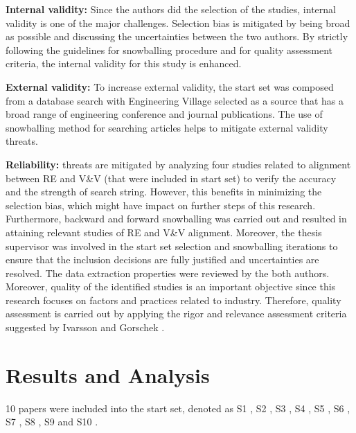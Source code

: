 \documentclass{article}
\begin{document}
\textbf{Internal validity:} Since the authors did the selection of the studies, internal validity is one of the major challenges. Selection bias is mitigated by being broad as possible and discussing the uncertainties between the two authors. By strictly following the guidelines for snowballing procedure and for quality assessment criteria, the internal validity for this study is enhanced. 

\textbf{External validity:} To increase external validity, the start set was composed from a database search with Engineering Village selected as a source that has a broad range of engineering conference and journal publications. The use of snowballing method for searching articles helps to mitigate external validity threats. 

\textbf{Reliability:} threats are mitigated by analyzing four studies related to alignment between RE and V\&V (that were included in start set) to verify the accuracy and the strength of search string. However, this benefits in minimizing the selection bias, which might have impact on further steps of this research.  Furthermore, backward and forward snowballing was carried out and resulted in attaining relevant studies of RE and V\&V alignment. Moreover, the thesis supervisor was involved in the start set selection and snowballing iterations to ensure that the inclusion decisions are fully justified and uncertainties are resolved.
The data extraction properties were reviewed by the both authors. Moreover, quality of the identified studies is an important objective since this research focuses on factors and practices related to industry. Therefore, quality assessment is carried out by applying the rigor and relevance assessment criteria suggested by Ivarsson and Gorschek \cite{ivarsson2011method}. 

\section{Results and Analysis}\label{ResultsAndAnalysis}
10 papers were included into the start set, denoted as S1 \cite{barmi2011alignment}, S2 \cite{kukkanen2009applying}, S3 \cite{sabaliauskaite2010challenges}, S4 \cite{post2009linking}, S5 \cite{uusitalo2008linking}, S6 \cite{graham2002requirements}, S7 \cite{larsson2014revisiting}, S8 \cite{wnuk2014delicate}, S9 \cite{bjarnason2014challenges} and S10 \cite{unterkalmsteiner2014taxonomy}. 
\end{document}
